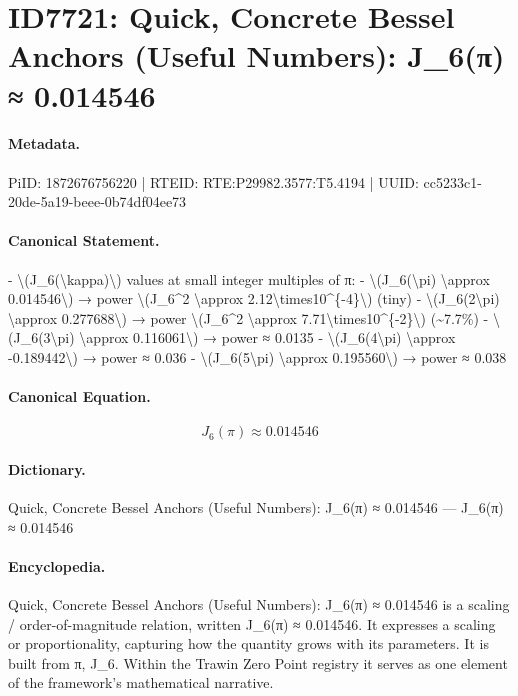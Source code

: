 \section*{ID7721: Quick, Concrete Bessel Anchors (Useful Numbers): J\_6(π) ≈ 0.014546}
\paragraph{Metadata.}
PiID: 1872676756220 | RTEID: RTE:P29982.3577:T5.4194 | UUID: cc5233c1-20de-5a19-beee-0b74df04ee73

\paragraph{Canonical Statement.}
- \textbackslash{}(J\_6(\textbackslash{}kappa)\textbackslash{}) values at small integer multiples of π: - \textbackslash{}(J\_6(\textbackslash{}pi) \textbackslash{}approx 0.014546\textbackslash{}) → power \textbackslash{}(J\_6\textasciicircum{}2 \textbackslash{}approx 2.12\textbackslash{}times10\textasciicircum{}\{-4\}\textbackslash{}) (tiny) - \textbackslash{}(J\_6(2\textbackslash{}pi) \textbackslash{}approx 0.277688\textbackslash{}) → power \textbackslash{}(J\_6\textasciicircum{}2 \textbackslash{}approx 7.71\textbackslash{}times10\textasciicircum{}\{-2\}\textbackslash{}) (\textasciitilde{}7.7\%) - \textbackslash{}(J\_6(3\textbackslash{}pi) \textbackslash{}approx 0.116061\textbackslash{}) → power ≈ 0.0135 - \textbackslash{}(J\_6(4\textbackslash{}pi) \textbackslash{}approx -0.189442\textbackslash{}) → power ≈ 0.036 - \textbackslash{}(J\_6(5\textbackslash{}pi) \textbackslash{}approx 0.195560\textbackslash{}) → power ≈ 0.038

\paragraph{Canonical Equation.}
\[
J_6(\pi) \approx 0.014546
\]

\paragraph{Dictionary.}
Quick, Concrete Bessel Anchors (Useful Numbers): J\_6(π) ≈ 0.014546 — J\_6(π) ≈ 0.014546

\paragraph{Encyclopedia.}
Quick, Concrete Bessel Anchors (Useful Numbers): J\_6(π) ≈ 0.014546 is a scaling / order-of-magnitude relation, written J\_6(π) ≈ 0.014546. It expresses a scaling or proportionality, capturing how the quantity grows with its parameters. It is built from π, J\_6. Within the Trawin Zero Point registry it serves as one element of the framework's mathematical narrative.
